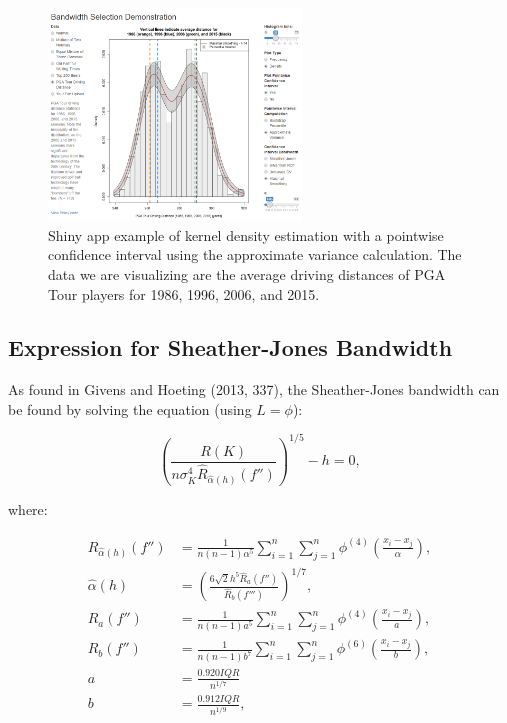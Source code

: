 \documentclass[]{article}
\begin{document}
\begin{figure}
\centering
\includegraphics[width=0.6\textwidth]{ShinyScreenshot4.png}
\caption{Shiny app example of kernel density estimation with a pointwise confidence interval using the approximate variance calculation. The data we are visualizing are the average driving distances of PGA Tour players for 1986, 1996, 2006, and 2015.}
\end{figure}

\pagebreak

\subsection{Expression for Sheather-Jones
Bandwidth}\label{expression-for-sheather-jones-bandwidth}

As found in Givens and Hoeting (2013, 337), the Sheather-Jones bandwidth
can be found by solving the equation (using \(L = \phi\)):

\[
\left( \frac{R(K)}{n\sigma^4_K\hat{R}_{\hat{\alpha}(h)}(f'')} \right)^{1/5} - h = 0,
\]

where:

\[
\begin{aligned}
\hat{R}_{\hat{\alpha}(h)}(f'') &= \frac{1}{n(n-1)\alpha^5}\sum_{i = 1}^{n}\sum_{j=1}^{n}\phi^{(4)}\left(\frac{x_i - x_j}{\alpha}\right), \\
\hat{\alpha}(h) &= \left(\frac{6\sqrt{2}h^5\hat{R}_a(f'')}{\hat{R}_b(f''')}\right)^{1/7},\\
\hat{R}_a(f'') &= \frac{1}{n(n-1)a^5}\sum_{i = 1}^{n}\sum_{j=1}^{n}\phi^{(4)}\left(\frac{x_i - x_j}{a}\right), \\
\hat{R}_b(f'') &= \frac{1}{n(n-1)b^7}\sum_{i = 1}^{n}\sum_{j=1}^{n}\phi^{(6)}\left(\frac{x_i - x_j}{b}\right), \\
a &= \frac{0.920 IQR}{n^{1/7}} \\
b &= \frac{0.912 IQR}{n^{1/9}},
\end{aligned}
\]
\end{document}
